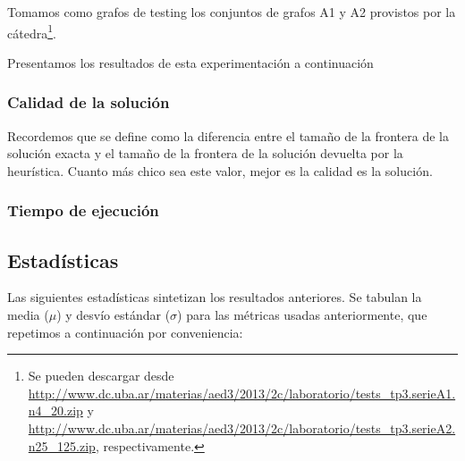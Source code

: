 \documentclass[a4paper, 10pt, twoside]{article}
\begin{document}
Tomamos como grafos de testing los conjuntos de grafos A1 y A2 provistos por la cátedra\footnote{Se pueden descargar desde \url{http://www.dc.uba.ar/materias/aed3/2013/2c/laboratorio/tests_tp3.serieA1.n4_20.zip} y \url{http://www.dc.uba.ar/materias/aed3/2013/2c/laboratorio/tests_tp3.serieA2.n25_125.zip}, respectivamente.}.

Presentamos los resultados de esta experimentación a continuación


\subsubsection{Calidad de la solución}

Recordemos que se define como la diferencia entre el tamaño de la frontera de la solución exacta y el tamaño de la frontera de la solución devuelta por la heurística. Cuanto más chico sea este valor, mejor es la calidad es la solución.

\begin{figure}[H]
	
\end{figure}

\begin{figure}[H]
	
\end{figure}

\begin{figure}[H]
	
\end{figure}


\subsubsection{Tiempo de ejecución}

\begin{figure}[H]
	
\end{figure}

\begin{figure}[H]
	
\end{figure}

\begin{figure}[H]
	
\end{figure}


\subsection{Estadísticas}

Las siguientes estadísticas sintetizan los resultados anteriores. Se tabulan la media ($\mu$) y desvío estándar ($\sigma$) para las métricas usadas anteriormente, que repetimos a continuación por conveniencia:
\end{document}

